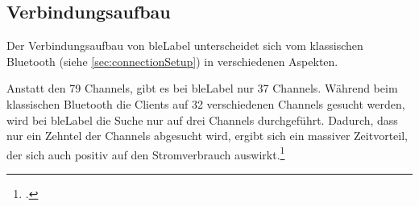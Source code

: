 


\subsection{Verbindungsaufbau}
\label{subsec:bleConnectionSetup}
Der Verbindungsaufbau von \gls{bleLabel} unterscheidet sich vom klassischen Bluetooth (siehe \cref{sec:connectionSetup}) in verschiedenen Aspekten.

Anstatt den 79 Channels, gibt es bei \gls{bleLabel} nur 37 Channels. Während beim klassischen Bluetooth die Clients auf 32 verschiedenen Channels gesucht werden, wird bei \gls{bleLabel} die Suche nur auf drei Channels durchgeführt.
Dadurch, dass nur ein Zehntel der Channels abgesucht wird, ergibt sich ein massiver Zeitvorteil, der sich auch positiv auf den Stromverbrauch auswirkt.\footcite[][3]{ti_whitepaper_2015-05-08}


